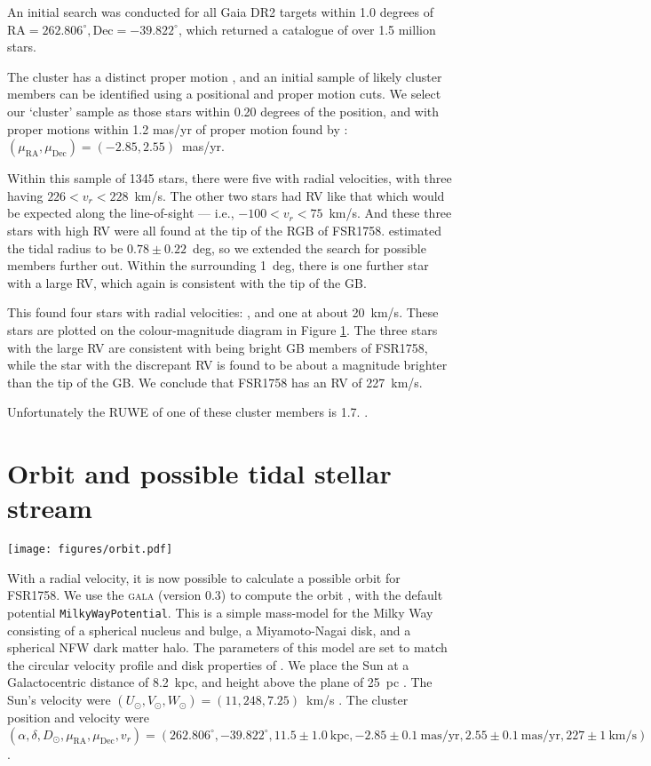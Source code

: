 \documentclass[fleqn,usenatbib,letters]{mnras}
\begin{document}
An initial search was conducted for all Gaia DR2 targets within 1.0 degrees of $\mathrm{RA}=262.806^\circ, \mathrm{Dec}=-39.822^\circ$, which returned a catalogue of over 1.5 million stars.

The cluster has a distinct proper motion \citep{Cantat-Gaudin2018, Barba2018}, and an initial sample of likely cluster members can be identified using a positional and proper motion cuts. We select our `cluster' sample as those stars within 0.20 degrees of the position, and with proper motions within 1.2 mas/yr of proper motion found by \citet{Barba2018}: $(\mu_\mathrm{RA},\mu_\mathrm{Dec})=(-2.85,2.55)$~mas/yr.

Within this sample of 1345 stars, there were five with radial velocities, with three having $226<v_r<228$~km/s. The other two stars had RV like that which would be expected along the line-of-sight --- i.e., $-100<v_r<75$~km/s. And these three stars with high RV were all found at the tip of the RGB of FSR1758. \citet{Barba2018} estimated the tidal radius to be $0.78\pm0.22$~deg, so we extended the search for possible members further out. Within the surrounding 1~deg, there is one further star with a large RV, which again is consistent with the tip of the GB. 

This found four stars with radial velocities: , and one at about 20~km/s. These stars are plotted on the colour-magnitude diagram in Figure \ref{}. The three stars with the large RV are consistent with being bright GB members of FSR1758, while the star with the discrepant RV is found to be about a magnitude brighter than the tip of the GB. We conclude that FSR1758 has an RV of 227~km/s.

Unfortunately the RUWE of one of these cluster members is 1.7. \citep{Lindegren2018}.


\section{Orbit and possible tidal stellar stream}

\begin{figure*}
	\texttt{[image: figures/orbit.pdf]}
    \caption{\label{fig:orbit}}
\end{figure*}

With a radial velocity, it is now possible to calculate a possible orbit for FSR1758. We use the \textsc{gala} (version 0.3) to compute the orbit \citep{M.Price-Whelan2017,Price-Whelan2018b}, with the default potential \texttt{MilkyWayPotential}. This is a simple mass-model for the Milky Way consisting of a spherical nucleus and bulge, a Miyamoto-Nagai disk, and a spherical NFW dark matter halo. The parameters of this model are set to match the circular velocity profile and disk properties of \citet{Bovy:2015gg}. We place the Sun at a Galactocentric distance of 8.2~kpc, and height above the plane of 25~pc \citep{BlandHawthorn:2016iq, Bland-hawthorn2018}. The Sun's velocity were $(U_\odot,V_\odot,W_\odot)=(11,248,7.25)$~km/s \citep{Schonrich2012}. The cluster position and velocity were $(\alpha,\delta,D_\odot,\mu_\mathrm{RA},\mu_\mathrm{Dec},v_r)=(262.806^\circ,-39.822^\circ,11.5\pm1.0~\mathrm{kpc},-2.85\pm0.1~\mathrm{mas/yr},2.55\pm0.1~\mathrm{mas/yr},227\pm1~\mathrm{km/s})$. 
\end{document}
